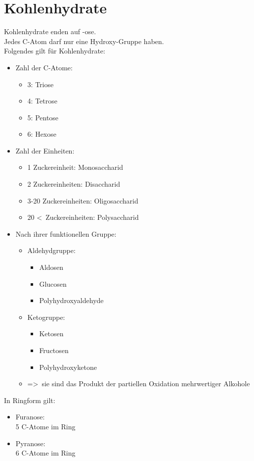 
\section{Kohlenhydrate} \label{sec:kohlenhydrate}

Kohlenhydrate enden auf -ose. \\
Jedes C-Atom darf nur eine Hydroxy-Gruppe haben. \\
Folgendes gilt für Kohlenhydrate:
\begin{itemize}
    \item Zahl der C-Atome:
        \begin{itemize}
            \item 3: Triose
            \item 4: Tetrose
            \item 5: Pentose
            \item 6: Hexose
        \end{itemize}
    \item Zahl der Einheiten:
        \begin{itemize}
            \item 1 Zuckereinheit: Monosaccharid
            \item 2 Zuckereinheiten: Disaccharid
            \item 3-20 Zuckereinheiten: Oligosaccharid
            \item 20 \textless\ Zuckereinheiten: Polysaccharid
        \end{itemize}
    \item Nach ihrer funktionellen Gruppe:
        \begin{itemize}
            \item Aldehydgruppe:
                \begin{itemize}
                    \item Aldosen
                    \item Glucosen
                    \item Polyhydroxyaldehyde
                \end{itemize}
            \item Ketogruppe:
                \begin{itemize}
                    \item Ketosen
                    \item Fructosen
                    \item Polyhydroxyketone
                \end{itemize}
            \item =\textgreater\ sie sind das Produkt der partiellen Oxidation mehrwertiger Alkohole
        \end{itemize}
\end{itemize}
In Ringform gilt:
\begin{itemize}
    \item Furanose: \\
        5 C-Atome im Ring
    \item Pyranose: \\
        6 C-Atome im Ring
\end{itemize}

